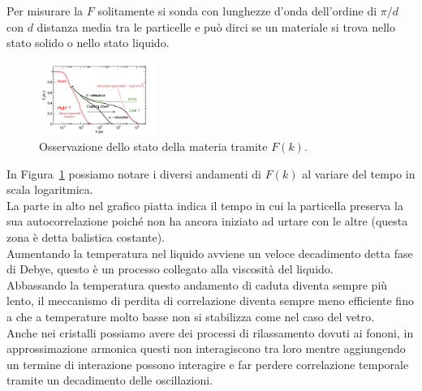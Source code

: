 Per misurare la $F$ solitamente si sonda con lunghezze d'onda dell'ordine di $\pi/d$ con $d$ distanza media tra le particelle e può dirci se un materiale si trova nello stato solido o nello stato liquido. 
\begin{figure}[ht]
	\centering
	\includegraphics[width=0.34\textwidth]{figures/Fsolido-liquido.png}
	\caption{Osservazione dello stato della materia tramite $F(k)$.}
	\label{fig:figures-Fsolido-liquido-png}
\end{figure}
In Figura~\ref{fig:figures-Fsolido-liquido-png} possiamo notare i diversi andamenti di $F(k)$ al variare del tempo in scala logaritmica.\\
La parte in alto nel grafico piatta indica il tempo in cui la particella preserva la sua autocorrelazione poiché non ha ancora iniziato ad urtare con le altre (questa zona è detta balistica costante).\\
Aumentando la temperatura nel liquido avviene un veloce decadimento detta fase di Debye, questo è un processo collegato alla viscosità del liquido.\\
Abbassando la temperatura questo andamento di caduta diventa sempre più lento, il meccanismo di perdita di correlazione diventa sempre meno efficiente fino a che a temperature molto basse non si stabilizza come nel caso del vetro.\\
Anche nei cristalli possiamo avere dei processi di rilassamento dovuti ai fononi, in approssimazione armonica questi non interagiscono tra loro mentre aggiungendo un termine di interazione possono interagire e far perdere correlazione temporale tramite un decadimento delle oscillazioni.
